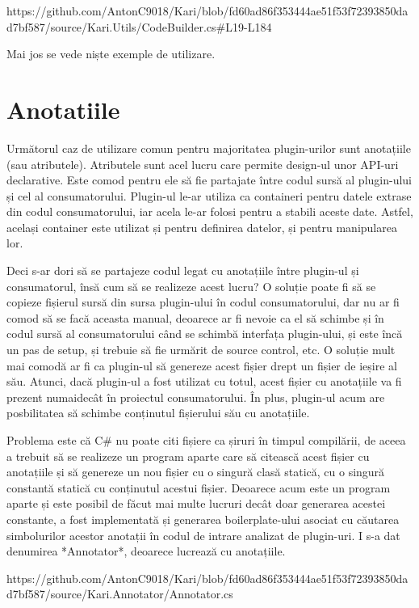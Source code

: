 \documentclass{report}
\begin{document}
https://github.com/AntonC9018/Kari/blob/fd60ad86f353444ae51f53f72393850dad7bf587/source/Kari.Utils/CodeBuilder.cs#L19-L184

Mai jos se vede niște exemple de utilizare.

\section{Anotatiile}

Următorul caz de utilizare comun pentru majoritatea plugin-urilor sunt anotațiile (sau atributele).
Atributele sunt acel lucru care permite design-ul unor API-uri declarative.
Este comod pentru ele să fie partajate între codul sursă al plugin-ului și cel al consumatorului.
Plugin-ul le-ar utiliza ca containeri pentru datele extrase din codul consumatorului, iar acela le-ar folosi pentru a stabili aceste date.
Astfel, același container este utilizat și pentru definirea datelor, și pentru manipularea lor.

Deci s-ar dori să se partajeze codul legat cu anotațiile între plugin-ul și consumatorul, însă cum să se realizeze acest lucru?
O soluție poate fi să se copieze fișierul sursă din sursa plugin-ului în codul consumatorului, dar nu ar fi comod să se facă aceasta manual, deoarece ar fi nevoie ca el să schimbe și în codul sursă al consumatorului când se schimbă interfața plugin-ului, și este încă un pas de setup, și trebuie să fie urmărit de source control, etc.
O soluție mult mai comodă ar fi ca plugin-ul să genereze acest fișier drept un fișier de ieșire al său.
Atunci, dacă plugin-ul a fost utilizat cu totul, acest fișier cu anotațiile va fi prezent numaidecât în proiectul consumatorului.
În plus, plugin-ul acum are posbilitatea să schimbe conținutul fișierului său cu anotațiile.

Problema este că C# nu poate citi fișiere ca șiruri în timpul compilării, de aceea a trebuit să se realizeze un program aparte care să citească acest fișier cu anotațiile și să genereze un nou fișier cu o singură clasă statică, cu o singură constantă statică cu conținutul acestui fișier.
Deoarece acum este un program aparte și este posibil de făcut mai multe lucruri decât doar generarea acestei constante, a fost implementată și generarea boilerplate-ului asociat cu căutarea simbolurilor acestor anotații în codul de intrare analizat de plugin-uri.
I s-a dat denumirea *Annotator*, deoarece lucrează cu anotațiile.

https://github.com/AntonC9018/Kari/blob/fd60ad86f353444ae51f53f72393850dad7bf587/source/Kari.Annotator/Annotator.cs
\end{document}
